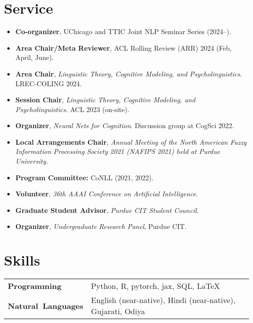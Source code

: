 \documentclass[11pt]{article}
\begin{document}
\section*{Service}
\begin{itemize}
    \item \textbf{Co-organizer}, UChicago and TTIC Joint NLP Seminar Series (2024--).
    \item \textbf{Area Chair/Meta Reviewer}, ACL Rolling Review (ARR) 2024 (Feb, April, June).
    \item \textbf{Area Chair}, \textit{Linguistic Theory, Cognitive Modeling, and Psycholinguistics}. LREC-COLING 2024.
    \item \textbf{Session Chair}, \textit{Linguistic Theory, Cognitive Modeling, and Psycholinguistics}. ACL 2023 (on-site).
    \item \textbf{Organizer}, \textit{Neural Nets for Cognition}. Discussion group at CogSci 2022.
    \item \textbf{Local Arrangements Chair}, \textit{Annual Meeting of the North American Fuzzy Information Processing Society 2021 (NAFIPS 2021) held at Purdue University.}
    \item \textbf{Program Committee:} CoNLL (2021, 2022).
    \item  \textbf{Volunteer}, \textit{36th AAAI Conference on Artificial Intelligence}.
    \item \textbf{Graduate Student Advisor}, \textit{Purdue CIT Student Council}.
    \item \textbf{Organizer}, \textit{Undergraduate Research Panel}, Purdue CIT.
\end{itemize}

\renewcommand*{\arraystretch}{1}
\section*{Skills}
\vspace{-1em}
\begin{longtable}{p{}  p{} }
    \textbf{Programming} & Python, R, pytorch, jax, SQL, \LaTeX\\
    \textbf{Natural~Languages} & English (near-native), Hindi (near-native), Gujarati, Odiya
    \end{longtable}
\end{document}
